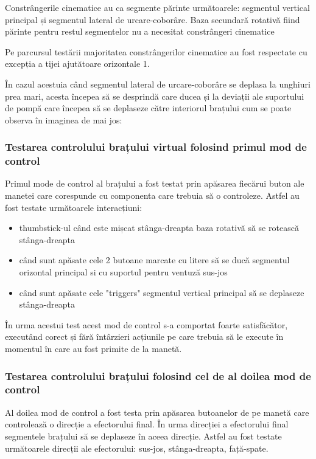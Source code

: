 Constrângerile cinematice au ca segmente părinte următoarele: segmentul vertical principal și segmentul lateral de urcare-coborâre. Baza secundară rotativă fiind părinte pentru restul segmentelor nu a necesitat constrângeri cinematice

Pe parcursul testării majoritatea constrângerilor cinematice au fost respectate cu excepția a tijei ajutătoare orizontale 1. 

În cazul acestuia când segmentul lateral de urcare-coborâre se deplasa la unghiuri prea mari, acesta începea să se desprindă care ducea și la deviații ale suportului de pompă care începea să se deplaseze către interiorul brațului cum se poate observa în imaginea de mai jos:


\subsubsection{Testarea controlului brațului virtual folosind primul mod de control}

Primul mode de control al brațului a fost testat prin apăsarea fiecărui buton ale manetei care corespunde cu componenta care trebuia să o controleze. Astfel au fost testate următoarele interacțiuni:
\begin{itemize}
	\item  thumbstick-ul când este mișcat stânga-dreapta baza rotativă să se rotească stânga-dreapta 
	\item  când sunt apăsate cele 2 butoane marcate cu litere să se ducă segmentul orizontal principal si cu suportul pentru ventuză sus-jos
	\item  când  sunt apăsate cele "triggers" segmentul vertical principal să se deplaseze stânga-dreapta
\end{itemize}

În urma acestui test acest mod de control s-a comportat foarte satisfăcător, executând corect și fără întârzieri acțiunile pe care trebuia să le execute în momentul în care au fost primite de la manetă.

\subsubsection{Testarea controlului brațului folosind cel de al doilea mod de control}
Al doilea mod de control a fost testa prin apăsarea butoanelor de pe manetă care controlează  o direcție a efectorului final. În urma direcției a efectorului final segmentele brațului să se deplaseze în aceea direcție. Astfel au fost testate următoarele direcții ale efectorului: sus-jos, stânga-dreapta, față-spate. 

